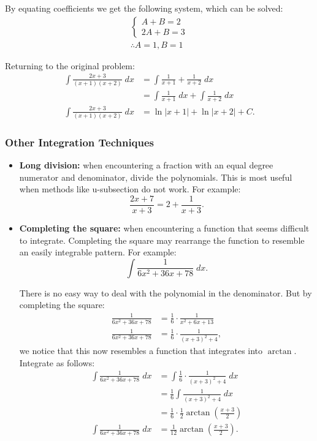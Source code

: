 \documentclass[12pt]{article}
\begin{document}
\noindent By equating coefficients we get the following system, which can be solved:
\begin{gather*}
	\begin{cases}
		A + B = 2 \\
		2A + B = 3
	\end{cases} \\
	\therefore A = 1, B = 1
\end{gather*}

\noindent Returning to the original problem:
\begin{align*}
	\int \frac{2x + 3}{(x + 1)(x + 2)} \; dx &= \int \frac{1}{x + 1} + \frac{1}{x + 2} \; dx \\[5pt]
	&= \int \frac{1}{x + 1} \; dx + \int \frac{1}{x + 2} \; dx \\[5pt]
	\int \frac{2x + 3}{(x + 1)(x + 2)} \; dx &= \ln |x + 1| + \ln |x + 2| + C.
\end{align*}

\subsubsection{Other Integration Techniques}
\begin{itemize}
	\item \textbf{Long division:} when encountering a fraction with an equal degree numerator and denominator, divide the polynomials. This is most useful when methods like u-subsection do not work. For example:
	\[ \frac{2x + 7}{x + 3} = 2 + \frac{1}{x + 3}. \]

	\item \textbf{Completing the square:} when encountering a function that seems difficult to integrate. Completing the square may rearrange the function to resemble an easily integrable pattern. For example:
	\[ \int \frac{1}{6x^2 + 36x + 78} \; dx. \]

	There is no easy way to deal with the polynomial in the denominator. But by completing the square:
	\begin{align*}
		\frac{1}{6x^2 + 36x + 78} &= \frac{1}{6} \cdot \frac{1}{x^2 + 6x + 13} \\[5pt]
		\frac{1}{6x^2 + 36x + 78} &= \frac{1}{6} \cdot \frac{1}{(x + 3)^2 + 4},
	\end{align*}
	we notice that this now resembles a function that integrates into $\arctan$. Integrate as follows:
	\begin{align*}
		\int \frac{1}{6x^2 + 36x + 78} \; dx &= \int \frac{1}{6} \cdot \frac{1}{(x + 3)^2 + 4} \; dx \\[5pt]
		&= \frac{1}{6} \int \frac{1}{(x + 3)^2 + 4} \; dx \\[5pt]
		&= \frac{1}{6} \cdot \frac{1}{2} \arctan \left( \frac{x + 3}{2} \right) \\[5pt]
		\int \frac{1}{6x^2 + 36x + 78} \; dx &= \frac{1}{12} \arctan \left( \frac{x + 3}{2} \right).
	\end{align*}
\end{itemize}
\end{document}
